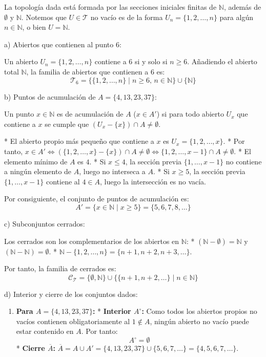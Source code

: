 \begin{sol}
    La topología dada está formada por las secciones iniciales finitas de $\mathbb{N}$, además de $\emptyset$ y $\mathbb{N}$. Notemos que $U \in \mathcal{T}$ no vacío es de la forma $U_n = \{1, 2, \dots, n\}$ para algún $n \in \mathbb{N}$, o bien $U = \mathbb{N}$.

    a) Abiertos que contienen al punto $6$:
    
    Un abierto $U_n = \{1, 2, \dots, n\}$ contiene a $6$ si y solo si $n \geq 6$. Añadiendo el abierto total $\mathbb{N}$, la familia de abiertos que contienen a $6$ es:
    \[
        \mathcal{T}_6 = \{\{1, 2, \dots, n\} \mid n \geq 6, \, n \in \mathbb{N}\} \cup \{\mathbb{N}\}
    \]

    b) Puntos de acumulación de $A = \{4, 13, 23, 37\}$:
    
    Un punto $x \in \mathbb{N}$ es de acumulación de $A$ ($x \in A'$) si para todo abierto $U_x$ que contiene a $x$ se cumple que $(U_x - \{x\}) \cap A \neq \emptyset$.
    
    * El abierto propio más pequeño que contiene a $x$ es $U_x = \{1, 2, \dots, x\}$.
    * Por tanto, $x \in A' \iff (\{1, 2, \dots, x\} - \{x\}) \cap A \neq \emptyset \iff \{1, 2, \dots, x-1\} \cap A \neq \emptyset$.
    * El elemento mínimo de $A$ es $4$. 
      * Si $x \leq 4$, la sección previa $\{1, \dots, x-1\}$ no contiene a ningún elemento de $A$, luego no interseca a $A$.
      * Si $x \geq 5$, la sección previa $\{1, \dots, x-1\}$ contiene al $4 \in A$, luego la intersección es no vacía.
    
    Por consiguiente, el conjunto de puntos de acumulación es:
    \[
        A' = \{x \in \mathbb{N} \mid x \geq 5\} = \{5, 6, 7, 8, \dots\}
    \]

    c) Subconjuntos cerrados:
    
    Los cerrados son los complementarios de los abiertos en $\mathbb{N}$:
    * $(\mathbb{N} - \emptyset) = \mathbb{N}$ y $(\mathbb{N} - \mathbb{N}) = \emptyset$.
    * $\mathbb{N} - \{1, 2, \dots, n\} = \{n+1, n+2, n+3, \dots\}$.
    
    Por tanto, la familia de cerrados es:
    \[
        \mathcal{C}_{\mathcal{T}} = \{\emptyset, \mathbb{N}\} \cup \{\{n+1, n+2, \dots\} \mid n \in \mathbb{N}\}
    \]

    d) Interior y cierre de los conjuntos dados:

    \begin{enumerate}[label=\arabic*)]
        \item \textbf{Para $A = \{4, 13, 23, 37\}$:}
        * \textbf{Interior $A^\circ$:} Como todos los abiertos propios no vacíos contienen obligatoriamente al $1 \notin A$, ningún abierto no vacío puede estar contenido en $A$. Por tanto:
          \[ A^\circ = \emptyset \]
        * \textbf{Cierre $\overline{A}$:} $\overline{A} = A \cup A' = \{4, 13, 23, 37\} \cup \{5, 6, 7, \dots\} = \{4, 5, 6, 7, \dots\}$.


\end{enumerate}
\end{sol}
